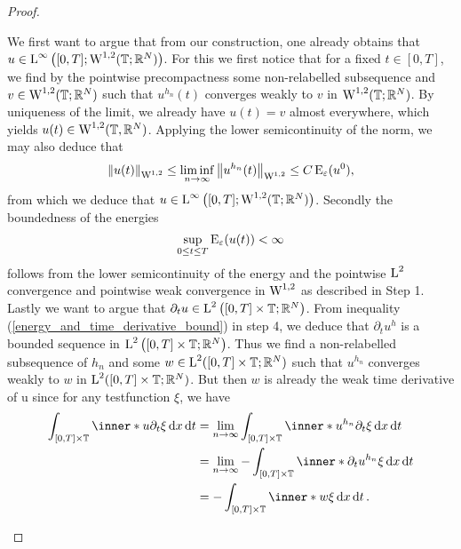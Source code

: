 \begin{proof}
\begin{description}[wide=0pt]
		We first want to argue that from our construction, one already obtains 
		that $ u \in \operatorname{L}^{ \infty } \left( [ 0 , T ] ; \operatorname{W}^{ 1, 2 } ( 
		\operatorname{\mathbb{T}} ; \mathbb{ R }^{ N } ) \right) $.
		For this we first notice that for a fixed $ t \in [ 0 , T ] $, we find 
		by the pointwise precompactness some
		non-relabelled subsequence and $ v \in \operatorname{W}^{ 1 , 2 } ( \operatorname{\mathbb{T}} ; 
		\mathbb{ R }^{ N } ) $ such that $ u^{ h_{ n } } ( t ) $ converges 
		weakly to $ v $ in $ \operatorname{W}^{ 1 , 2 } ( \operatorname{\mathbb{T}} ; \mathbb{ R }^{ N } ) 
		$. By uniqueness of the limit, we already have $ u ( t ) = v $ almost 
		everywhere, which yields $ u ( t ) \in \operatorname{W}^{ 1 , 2 } ( \operatorname{\mathbb{T}}, 
		\mathbb{ R }^{ N } ) $. Applying the lower semicontinuity of the norm, 
		we may also deduce 
		that
		\begin{equation*}
			\norm{ u ( t ) }_{ \operatorname{W}^{ 1 , 2 } }
			\leq
			\liminf_{ n \to \infty }
			\norm{ u^{ h_{ n } } ( t ) }_{ \operatorname{W}^{ 1 , 2 } }
			\leq
			C \operatorname{E}_{ \varepsilon } ( u^{ 0 } ),
		\end{equation*}
		from which we deduce that $ u \in \operatorname{L}^{ \infty } \left( [ 0 , T ] ; \operatorname{W}^{ 1 , 2 } ( \operatorname{\mathbb{T}} ; \mathbb{ R }^{ N } ) \right) $.	
		Secondly the boundedness of the energies
		\begin{equation*}
			\sup_{ 0 \leq t \leq T }
			\operatorname{E}_{ \varepsilon } ( u ( t ) ) 
			< \infty
		\end{equation*}
		follows from the lower semicontinuity of the energy and the pointwise $ 
		\operatorname{L}^{ 2 } $ convergence and pointwise weak convergence in $ \operatorname{W}^{ 1 , 
		2 } $ as described in Step 1.
		Lastly we want to argue that $ \partial_{ t } u \in \operatorname{L}^{2 } \left( [ 0 
		, T ] \times \operatorname{\mathbb{T}} ; \mathbb{ R }^{ N } \right) $. From inequality 
		(\ref{energy_and_time_derivative_bound}) in step 4, we deduce that $ 
		\partial_{ t } u^{ h } $ is a bounded sequence in $ \operatorname{L}^{ 2 } \left( [ 
		0 , T ] 
		\times \operatorname{\mathbb{T}}; \mathbb{ R }^{ N } \right) $. Thus we find a 
		non-relabelled subsequence of $ h_{ n } $ and some $ w \in \operatorname{L}^{ 2 } ( 
		[ 0 , T ] \times \operatorname{\mathbb{T}} ; \mathbb{ R }^{ N } ) $ such that $ u^{ 
		h_{n } } $ converges weakly to $ w $ in $ \operatorname{L}^{ 2 } ( [0, T ] \times 
		\operatorname{\mathbb{T}} ; \mathbb{ R }^{ N } ) $. But then $ w $ is already the weak 
		time derivative of u since for any testfunction $ \xi $, we have
		\begin{align*}
			\int_{ [ 0 , T ] \times \flattorus }
			\inner*{ u }{ \partial_{ t } \xi }
			\dd{ x } \dd{ t }
			& =
			\lim_{ n \to \infty }
			\int_{ [ 0 , T ] \times \flattorus }
			\inner*{ u^{ h_{ n } } }{ \partial_{ t } \xi }
			\dd{ x } \dd{ t }
			\\
			& =
			\lim_{n \to \infty }
			- \int_{ [ 0 , T ] \times \flattorus }
			\inner*{ \partial_{ t } u^{ h_{ n } } }{ \xi }
			\dd{ x }\dd{ t }
			\\
			& =
			- \int_{ [ 0 , T ] \times \flattorus }
			\inner*{ w }{ \xi }
			\dd{ x } \dd{ t }.
		\end{align*}
		

\end{description}
\end{proof}
